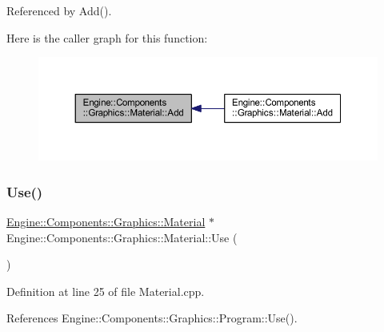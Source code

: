 Referenced by Add().

Here is the caller graph for this function\+:
\nopagebreak
\begin{figure}[H]
\begin{center}
\leavevmode
\includegraphics[width=350pt]{classEngine_1_1Components_1_1Graphics_1_1Material_ace1e6c024847604594bc4f3d99d0be08_icgraph}
\end{center}
\end{figure}
\mbox{\label{classEngine_1_1Components_1_1Graphics_1_1Material_aef1dd6fbbf0268d4f3e6c371a2f1aa8d}} 
\subsubsection{\texorpdfstring{Use()}{Use()}}
{\footnotesize\ttfamily \mbox{\hyperlink{classEngine_1_1Components_1_1Graphics_1_1Material}{Engine\+::\+Components\+::\+Graphics\+::\+Material}} $\ast$ Engine\+::\+Components\+::\+Graphics\+::\+Material\+::\+Use (\begin{DoxyParamCaption}{ }\end{DoxyParamCaption})}



Definition at line 25 of file Material.\+cpp.



References Engine\+::\+Components\+::\+Graphics\+::\+Program\+::\+Use().



